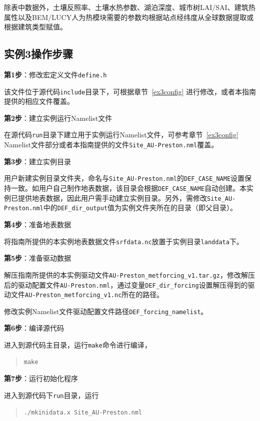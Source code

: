 除表中数据外，土壤反照率、土壤水热参数、湖泊深度、城市树LAI/SAI、建筑热属性以及BEM/LUCY人为热模块需要的参数均根据站点经纬度从全球数据提取或根据建筑类型赋值。

\subsection{实例3操作步骤}

\textbf{第1步}：修改宏定义文件\texttt{define.h}

该文件位于源代码\texttt{include}目录下，可根据章节~\ref{ex3config} 进行修改，或者本指南提供的相应文件覆盖。

\bigskip
\textbf{第2步}：建立实例运行Namelist文件

在源代码\texttt{run}目录下建立用于实例运行Namelist文件，可参考章节~\ref{ex3config} Namelist文件部分或者本指南提供的文件\texttt{Site\_AU-Preston.nml}覆盖。

\bigskip
\textbf{第3步}：建立实例目录

用户新建实例目录文件夹，命名与\texttt{Site\_AU-Preston.nml}的\texttt{DEF\_CASE\_NAME}设置保持一致。如用户自己制作地表数据，该目录会根据\texttt{DEF\_CASE\_NAME}自动创建。本实例已提供地表数据，因此用户需手动建立实例目录。另外，需修改\texttt{Site\_AU-Preston.nml}中的\texttt{DEF\_dir\_output}值为实例文件夹所在的目录（即父目录）。

\bigskip
\textbf{第4步}：准备地表数据

将指南所提供的本实例地表数据文件\texttt{srfdata.nc}放置于实例目录\texttt{landdata}下。

\bigskip
\textbf{第5步}：准备驱动数据

解压指南所提供的本实例驱动文件\texttt{AU-Preston\_metforcing\_v1.tar.gz}，修改解压后的驱动配置文件\texttt{AU-Preston.nml}，通过变量\texttt{DEF\_dir\_forcing}设置解压得到的驱动文件\texttt{AU-Preston\_metforcing\_v1.nc}所在的路径。

修改实例Namelist文件驱动配置文件路径\texttt{DEF\_forcing\_namelist}。

\bigskip
\textbf{第6步}：编译源代码

进入到源代码主目录，运行\texttt{make}命令进行编译，
\begin{quote}
\begin{lstlisting}
make
\end{lstlisting}
\end{quote}

\bigskip
\textbf{第7步}：运行初始化程序

进入到源代码下\texttt{run}目录，运行
\begin{quote}
\begin{lstlisting}
./mkinidata.x Site_AU-Preston.nml
\end{lstlisting}
\end{quote}

